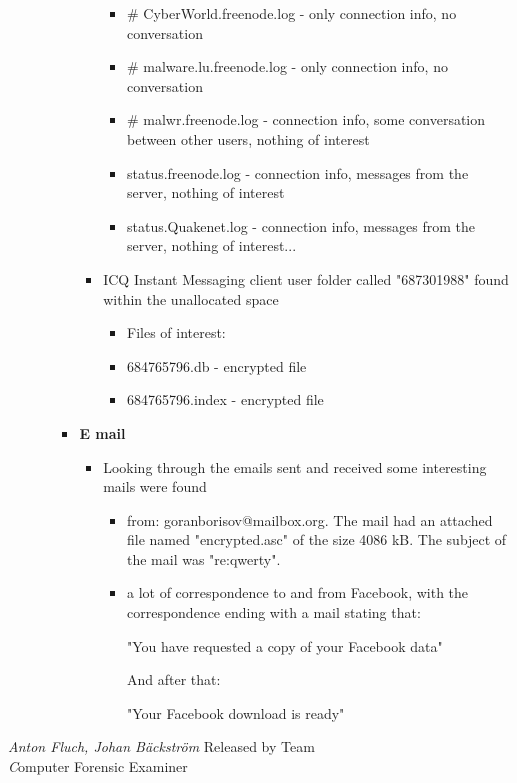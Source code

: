 \begin{enumerate}
\begin{itemize}
\begin{itemize}
\begin{itemize}
\begin{itemize}
		 		\item \# CyberWorld.freenode.log - only connection info, no conversation
		 		\item \# malware.lu.freenode.log - only connection info, no conversation
		 		\item \# malwr.freenode.log - connection info, some conversation between other users, nothing of interest
		 		\item status.freenode.log - connection info, messages from the server, nothing of interest
		 		\item status.Quakenet.log - connection info, messages from the server, nothing of interest...
		 	\end{itemize}
		 	
		 	\item ICQ Instant Messaging client user folder called "687301988" found within the unallocated space
		 	\begin{itemize}
		 		\item Files of interest: 
		 		\item 684765796.db - encrypted file
		 		\item 684765796.index - encrypted file
		 	\end{itemize}
		 	
		 \end{itemize}
		 
		 
		 
		 \item \textbf{E mail}
		 \begin{itemize}
		 		\item Looking through the emails sent and received some interesting mails were found
		 		 
		 		\begin{itemize}
		 			\item from: goranborisov@mailbox.org. The mail had an attached file named "encrypted.asc" of the size 4086 kB. The subject of the mail was "re:qwerty". 
		 			
		 			\item a lot of correspondence to and from Facebook, with the correspondence ending with a mail stating that:
		 			
		 			"You have requested a copy of your Facebook data"
		 			
		 			And after that:
		 			
		 			"Your Facebook download is ready"
		 			
		 		\end{itemize}
		 
		 
		 \end{itemize}
		
	\end{itemize}
	
		
	
\end{itemize}

\end{enumerate}

\noindent \textit{Anton Fluch, Johan Bäckström}	\hfill Released by {\wesa Team}\\
\textit Computer Forensic Examiner
\clearpage

